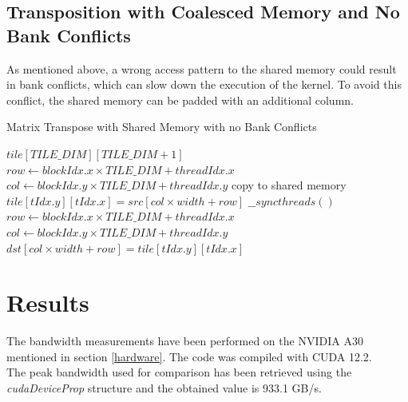 \documentclass{IEEEconf}
\begin{document}
\subsection{Transposition with Coalesced Memory and No Bank Conflicts}
As mentioned above, a wrong access pattern to the shared memory could result in bank conflicts, which can slow down the execution
of the kernel. To avoid this conflict, the shared memory can be padded with an additional column.
\begin{algorithm}
    \caption{Matrix Transpose with Shared Memory with no Bank Conflicts}
    \begin{algorithmic}[1]
            \State $tile [TILE\_DIM][TILE\_DIM + 1]$
            \State $row \gets blockIdx.x \times TILE\_DIM + threadIdx.x$
            \State $col \gets blockIdx.y \times TILE\_DIM + threadIdx.y$
             \Comment copy to shared memory
                \State $tile[tIdx.y][tIdx.x] = src[col \times width + row]$
            \EndIf
            \State $\_\_syncthreads()$
            \State $row \gets blockIdx.x \times TILE\_DIM + threadIdx.x$
            \State $col \gets blockIdx.y \times TILE\_DIM + threadIdx.y$
                \State $dst[col \times width + row] = tile[tIdx.y][tIdx.x]$
            \EndIf
        \EndProcedure
    \end{algorithmic}
\end{algorithm}
\section{Results} \label{results}
The bandwidth measurements have been performed on the NVIDIA A30 mentioned 
in section \ref{hardware}. The code was compiled with CUDA 12.2. \\
The peak bandwidth used for comparison has been retrieved using the \textit{cudaDeviceProp} structure \cite{nvidia:cudaDeviceProp} and
the obtained value is 933.1 GB/s. 
\end{document}
